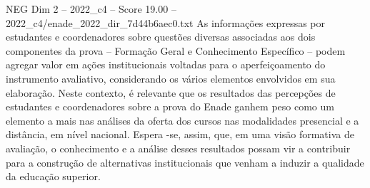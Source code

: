 \begin{textsample}{NEG Dim 2 – 2022\_c4 – Score 19.00 – 2022\_c4/enade\_2022\_dir\_7d44b6aec0.txt}
As informações expressas por estudantes e coordenadores sobre questões diversas associadas aos dois componentes da prova – Formação Geral e Conhecimento Específico – podem agregar valor em ações institucionais voltadas para o aperfeiçoamento do instrumento avaliativo, considerando os vários elementos envolvidos em sua elaboração.
Neste contexto, é relevante que os resultados das percepções de estudantes e coordenadores sobre a prova do Enade ganhem peso como um elemento a mais nas análises da oferta dos cursos nas modalidades presencial e a distância, em nível nacional.
Espera -se, assim, que, em uma visão formativa de avaliação, o conhecimento e a análise desses resultados possam vir a contribuir para a construção de alternativas institucionais que venham a induzir a qualidade da educação superior.

\end{textsample}
